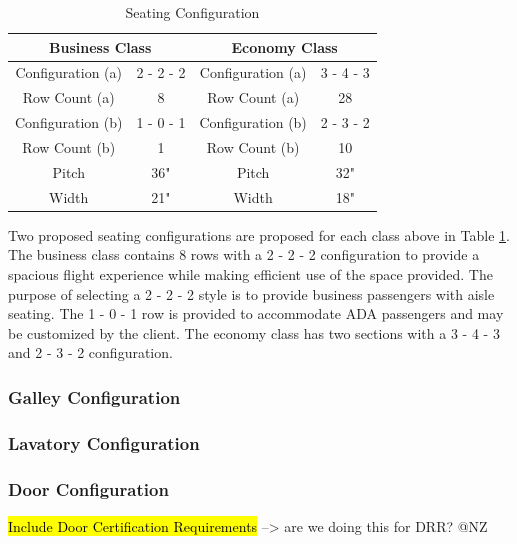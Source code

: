 \begin{table}[!h]
    \centering
    \caption{Seating Configuration}
    \begin{tabular}{|c|c||c|c|} \toprule
        \multicolumn{2}{c}{\textbf{Business Class}} & \multicolumn{2}{c}{\textbf{Economy Class}} \\ \hline
        Configuration (a) & 2 - 2 - 2 & Configuration (a) & 3 - 4 - 3 \\ \hline
        Row Count (a) & 8 & Row Count (a) & 28 \\ \hline
        Configuration (b) & 1 - 0 - 1 & Configuration (b) & 2 - 3 - 2 \\ \hline
        Row Count (b) & 1 & Row Count (b) & 10 \\ \hline
        Pitch & 36" & Pitch & 32" \\ \hline
        Width & 21" & Width & 18" \\ \bottomrule
    \end{tabular}
    \label{tab:seating}
\end{table}

Two proposed seating configurations are proposed for each class above in Table \ref{tab:seating}.  The business class contains 8 rows with a 2 - 2 - 2 configuration to provide a spacious flight experience while making efficient use of the space provided.  The purpose of selecting a 2 - 2 - 2 style is to provide business passengers with aisle seating.  The 1 - 0 - 1 row is provided to accommodate ADA passengers and may be customized by the client.  The economy class has two sections with a 3 - 4 - 3 and 2 - 3 - 2 configuration.

\subsubsection{Galley Configuration}

\subsubsection{Lavatory Configuration}

\subsubsection{Door Configuration}

\hl{Include Door Certification Requirements} --> are we doing this for DRR?  @NZ



